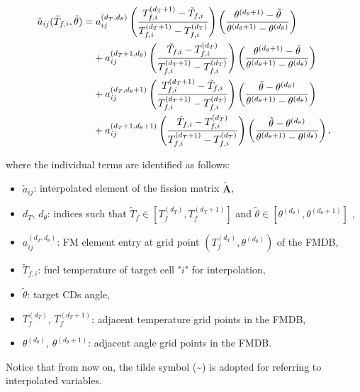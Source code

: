 \documentclass[preprint,review,12pt]{elsarticle}
\begin{document}
\begin{align}
\tilde{a}_{ij}(\tilde{T}_{f,i}, \tilde{\theta}) =&\; a_{ij}^{(d_T, d_{\theta})}
\left( \frac{T_{f,i}^{(d_T+1)} - \tilde{T}_{f,i}}{T_{f,i}^{(d_T+1)} - T_{f,i}^{(d_T)}} \right)
\left( \frac{\theta^{(d_{\theta}+1)} - \tilde{\theta}}{\theta^{(d_{\theta}+1)} - \theta^{(d_{\theta})}} \right) \notag \\
&+ a_{ij}^{(d_T+1, d_{\theta})}
\left( \frac{\tilde{T}_{f,i} - T_{f,i}^{(d_T)}}{T_{f,i}^{(d_T+1)} - T_{f,i}^{(d_T)}} \right)
\left( \frac{\theta^{(d_{\theta}+1)} - \tilde{\theta}}{\theta^{(d_{\theta}+1)} - \theta^{(d_{\theta})}} \right) \notag \\
&+ a_{ij}^{(d_T, d_{\theta}+1)}
\left( \frac{T_{f,i}^{(d_T+1)} - \tilde{T}_{f,i}}{T_{f,i}^{(d_T+1)} - T_{f,i}^{(d_T)}} \right)
\left( \frac{\tilde{\theta} - \theta^{(d_{\theta})}}{\theta^{(d_{\theta}+1)} - \theta^{(d_{\theta})}} \right) \notag \\
&+ a_{ij}^{(d_T+1, d_{\theta}+1)}
\left( \frac{\tilde{T}_{f,i} - T_{f,i}^{(d_T)}}{T_{f,i}^{(d_T+1)} - T_{f,i}^{(d_T)}} \right)
\left( \frac{\tilde{\theta} - \theta^{(d_{\theta})}}{\theta^{(d_{\theta}+1)} - \theta^{(d_{\theta})}} \right),
\end{align}

where the individual terms are identified as follows:
\begin{itemize}
  \item $\tilde{a}_{ij}$: interpolated element of the fission matrix $\tilde{\mathbf{A}}$,
  \item $d_T$, $d_{\theta}$: indices such that $\tilde{T}_f \in [T_f^{(d_T)}, T_f^{(d_T+1)}]$ and $\tilde{\theta} \in [\theta^{(d_{\theta})}, \theta^{(d_{\theta}+1)}]$  ,
  \item $a_{ij}^{(d_T, d_{\theta})}$: FM element entry at grid point $(T_f^{(d_T)}, \theta^{(d_{\theta})})$ of the FMDB,
  \item $\tilde{T}_{f,i}$: fuel temperature of target cell "$i$" for interpolation,
  \item $\tilde{\theta}$: target CDs angle,
  \item $T_f^{(d_T)}$, $T_f^{(d_T+1)}$: adjacent temperature grid points in the FMDB,
  \item $\theta^{(d_{\theta})}$, $\theta^{(d_{\theta}+1)}$: adjacent angle grid points in the FMDB.
\end{itemize}

Notice that from now on, the tilde symbol (\textasciitilde) is adopted for referring to interpolated variables.   
\end{document}
